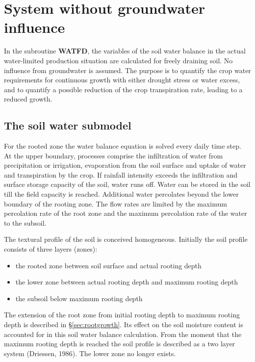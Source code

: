 \section{System without groundwater influence}
\label{sec:WATFD}

In the subroutine {\bf WATFD}, the variables of the soil water balance in the actual 
water-limited production situation are calculated for freely draining soil. No influence from
groundwater is assumed. The purpose is to quantify the crop water requirements for
continuous growth with either drought stress or water excess, and to quantify a possible
reduction of the crop transpiration rate, leading to a reduced growth.

\subsection{The soil water submodel}

For the rooted zone the water balance equation is solved every daily time step. At the
upper boundary, processes comprise the infiltration of water from precipitation or
irrigation, evaporation from the soil surface and uptake of water and transpiration by the
crop. If rainfall intensity exceeds the infiltration and surface storage capacity of the soil,
water runs off. Water can be stored in the soil till the field capacity is reached. Additional
water percolates beyond the lower boundary of the rooting zone.
The flow rates are limited by the maximum percolation rate of the root zone and the
maximum percolation rate of the water to the subsoil.

The textural profile of the soil is conceived homogeneous. Initially the soil profile
consists of three layers (zones):
\begin{itemize}
\item the rooted zone between soil surface and actual rooting depth
\item the lower zone between actual rooting depth and maximum rooting depth
\item the subsoil below maximum rooting depth
\end{itemize}

The extension of the root zone from initial rooting depth to maximum rooting depth is
described in \S \ref{sec:rootgrowth}. Its effect on the soil moisture content is accounted 
for in this soil water
balance calculation. From the moment that the maximum rooting depth is reached the soil
profile is described as a two layer system (Driessen, 1986). The lower zone no longer
exists.

